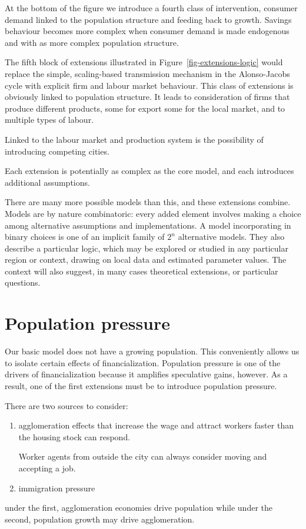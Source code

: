 At the bottom of the figure we introduce a fourth class of intervention, consumer demand linked to the population structure and feeding back to growth. Savings behaviour becomes more  complex when consumer demand is made endogenous and with as more complex population structure.

The fifth block of extensions illustrated in Figure~\ref{fig-extensions-logic} would replace the simple, scaling-based transmission mechanism in the Alonso-Jacobs cycle with explicit firm and labour market behaviour. This class of extensions is obviously linked to population structure. It leads to consideration of firms that produce different products, some for export some for the local market, and to multiple types of labour.

Linked to the labour market and production system is the possibility of introducing competing cities. 

Each extension is potentially as complex as the core model, and each introduces additional assumptions. 

There are many more possible models than this, and these extensions combine. Models are by nature combinatoric: every added element involves making a choice among alternative assumptions and implementations. A model incorporating in binary choices is one of an implicit family of $2^n$ alternative models. 
They also describe a particular logic, which may be explored or studied in any particular region or context, drawing on local data and estimated parameter values. The context will also suggest, in many cases theoretical extensions, or particular questions.

\section{Population pressure} 
Our basic model does not have a growing population. This conveniently allows us to isolate certain effects of financialization. Population pressure is one of the drivers of financialization because it amplifies speculative gains, however. As a result, one of the first extensions must be  to introduce population pressure.

There are two sources to consider: 
\begin{enumerate}
\item agglomeration effects that increase the wage and attract workers faster than the housing stock can respond. 

Worker agents from outside the city can always consider moving and accepting a job. 
\item immigration pressure
\end{enumerate}
under the  first, agglomeration economies drive population while under the second, population growth may drive agglomeration.


